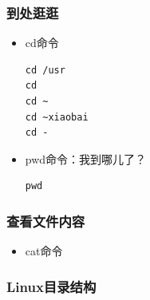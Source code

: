 \documentclass[xcolor=svgnames,bigger,presentation]{beamer}
\begin{document}
\begin{frame}[fragile]
\frametitle{到处逛逛}
\label{sec-4-2-11}
\begin{itemize}

\item cd命令\\
\label{sec-4-2-11-1}%
\begin{verbatim}
cd /usr
cd
cd ~
cd ~xiaobai
cd -
\end{verbatim}

\item pwd命令：我到哪儿了？\\
\label{sec-4-2-11-2}%
\begin{verbatim}
pwd
\end{verbatim}
\end{itemize} %
\end{frame}
\begin{frame}
\frametitle{查看文件内容}
\label{sec-4-2-12}
\begin{itemize}

\item cat命令
\label{sec-4-2-12-1}%
\end{itemize} %
\end{frame}
\begin{frame}
\frametitle{Linux目录结构}
\label{sec-4-2-13}
\end{frame}
\end{document}
